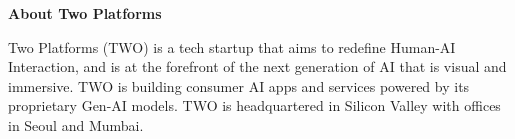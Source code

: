 \documentclass{article}
\begin{document}



 
\vspace{10pt}
{\large \textbf{About Two Platforms}}

Two Platforms (TWO) is a tech startup that aims to redefine Human-AI Interaction, and is at the forefront of the next generation of AI that is visual and immersive. TWO is building consumer AI apps and services powered by its proprietary Gen-AI models. TWO is headquartered in Silicon Valley with offices in Seoul and Mumbai.
\end{document}
